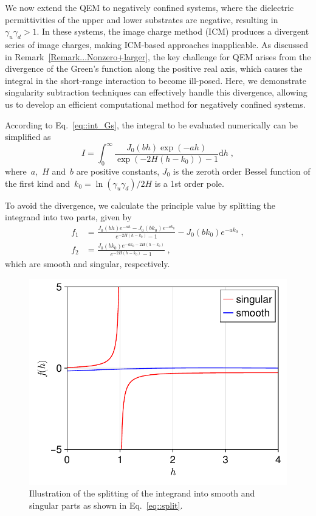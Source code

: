 We now extend the QEM to negatively confined systems, where the dielectric permittivities of the upper and lower substrates are negative, resulting in~$\gamma_u \gamma_d > 1$. 
In these systems, the image charge method (ICM) produces a divergent series of image charges, making ICM-based approaches inapplicable.
As discussed in Remark~\ref{Remark...Nonzero+larger}, the key challenge for QEM arises from the divergence of the Green's function along the positive real axis, which causes the integral in the short-range interaction to become ill-posed.
Here, we demonstrate singularity subtraction techniques can effectively handle this divergence, allowing us to develop an efficient computational method for negatively confined systems.

According to Eq.~\eqref{eq::int_Gs}, the integral to be evaluated numerically can be simplified as
\begin{equation}\label{eq::int_I}
    I = \int_0^{\infty} \frac{J_0(b h) \exp{(- a h)}}{\exp{( - 2 H (h - k_0))} - 1} \mathrm{d}h\;,
\end{equation}
where~$a$,~$H$ and~$b$ are positive constants, $J_0$ is the zeroth order Bessel function of the first kind and~$k_0 = {\ln{(\gamma_u \gamma_d)}} / {2H}$ is a 1st order pole.

To avoid the divergence, we calculate the principle value by splitting the integrand into two parts, given by
\begin{equation}\label{eq::split}
    \begin{split}
        f_{1} &=  \frac{J_0(b h) e^{- a h} - J_0(b k_0) e^{- a k_0}}{e^{- 2 H (h - k_0)} - 1} - J_0(b k_0) e^{- a k_0} \;, \\
        f_{2} &= \frac{J_0(b k_0) e^{- a k_0 - 2 H (h - k_0)}}{e^{- 2 H (h - k_0)} - 1} \;,
    \end{split}
\end{equation}
which are smooth and singular, respectively.

\begin{figure}[ht]
    \centering
    \includegraphics[width = 0.5\linewidth]{figs/fi.pdf}
    \caption{Illustration of the splitting of the integrand into smooth and singular parts as shown in Eq.~\eqref{eq::split}.}
    \label{fig:split}
\end{figure}

